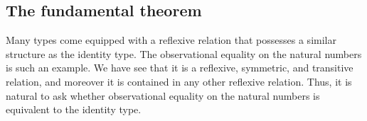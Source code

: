 \begin{comment}
\begin{proof}
  First we note that for any family of types $P(m,n,e)$ indexed by $m,n:\N$ and $e:\EqN(m,n)$, there is a type family $P'$ given by
  \begin{equation*}
    P'(m,n,e)\defeq P(\succN(m),\succN(n),e).
  \end{equation*}
  Similarly, for any $p:\prd{n:\N}P(n,n,\mathsf{refl\usc{}Eq}_\N(n))$ we have
  \begin{equation*}
    p':\prd{n:\N}P'(n,n,\mathsf{ref\usc{}Eq}_\N(n))
  \end{equation*}
  given by $p'(n)\defeq p(\succN(n))$. Now we define a function
  \begin{equation*}
    f(m,n,e,P):\Big(\prd{n:\N}P(n,n,\mathsf{refl\usc{}Eq}_\N(n))\Big)\to P(m,n,e)
  \end{equation*}
  for every $m,n:\N$, $e:\EqN(m,n)$ and $P:\prd{x,y:\N}\EqN(x,y)\to\UU$ by induction on $m,n:\N$ by
  \begin{align*}
    f(\zeroN,\zeroN,\ttt,P,p) & \defeq p(\zeroN) \\
    f(\zeroN,\succN(n)) & \defeq \indempty \\
    f(\succN(m),\zeroN) & \defeq \indempty \\
    f(\succN(m),\succN(n),e,P,p) & \defeq f(m,n,e,P',p').
  \end{align*}
  Then we define $\mathsf{ind\usc{}Eq}_\N$ for every $P:\prd{x,y:\N}\EqN(x,y)\to\UU$ by
  \begin{equation*}
    \mathsf{ind\usc{}Eq}_\N(p,m,n,e)\defeq f(m,n,e,P,p).
  \end{equation*}
  This completes the first part of the claim. For the second part, we have to construct an identification
  \begin{equation*}
    \mathsf{comp\usc{}Eq}_\N(p,n):\mathsf{ind\usc{}Eq}_\N(p,n,\mathsf{refl\usc{}Eq}_\N(n))= p
  \end{equation*}
  for any $p:P(n,\mathsf{refl\usc{}Eq}_\N(n))$. This is again by induction on $n:\N$.
\end{proof}
\end{comment}

\subsection{The fundamental theorem}

Many types come equipped with a reflexive relation that possesses a similar
structure as the identity type. The observational equality on the natural
numbers is such an example. We have see that it is a reflexive, symmetric, and
transitive relation, and moreover it is contained in any other reflexive
relation. Thus, it is natural to ask whether observational equality on the natural numbers is equivalent to the identity type.

